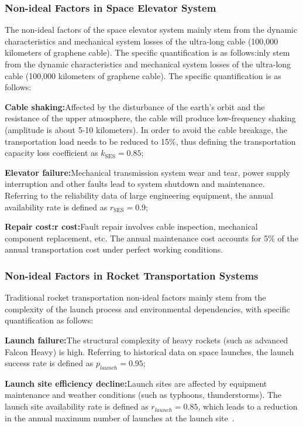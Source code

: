 \subsubsection{Non-ideal Factors in Space Elevator System}

The non-ideal factors of the space elevator system mainly stem from the dynamic characteristics and mechanical system losses of the ultra-long cable (100,000 kilometers of graphene cable). 
The specific quantification is as follows:inly stem from the dynamic characteristics and mechanical system losses of the ultra-long cable (100,000 kilometers of graphene cable). The specific quantification is as follows:

\textbf{Cable shaking:}Affected by the disturbance of the earth's orbit and the resistance of the upper atmosphere, the cable will produce low-frequency shaking (amplitude is about 5-10 kilometers). In order to avoid the cable breakage, the transportation load needs to be reduced to 15\%, thus defining the transportation capacity loss coefficient as \(k_{\text{SES}} = 0.85\);

\textbf{Elevator failure:}Mechanical transmission system wear and tear, power supply interruption and other faults lead to system shutdown and maintenance. Referring to the reliability data of large engineering equipment, the annual availability rate is defined as \(r_{\text{SES}} = 0.9\);

\textbf{Repair cost:r cost:}Fault repair involves cable inspection, mechanical component replacement, etc. The annual maintenance cost accounts for 5\% of the annual transportation cost under perfect working conditions.


\subsubsection{Non-ideal Factors in Rocket Transportation Systems}

Traditional rocket transportation non-ideal factors mainly stem from the complexity of the launch process and environmental dependencies, with specific quantification as follows:

\textbf{Launch failure:}The structural complexity of heavy rockets (such as advanced Falcon Heavy) is high. Referring to historical data on space launches, the launch success rate is defined as \(p_{launch} = 0.95\);

\textbf{Launch site efficiency decline:}Launch sites are affected by equipment maintenance and weather conditions (such as typhoons, thunderstorms). The launch site availability rate is defined as \(r_{launch} = 0.85\), which leads to a reduction in the annual maximum number of launches at the launch site~\cite{nasa_weather_07R}.

